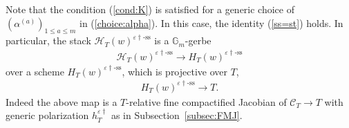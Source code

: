 \documentclass[11pt,oneside,a4paper,mathscr]{amsart}
\theoremstyle{definition}
\renewcommand{\leq}{\leqslant}
\newcommand{\cH}{\mathcal{H}}
\newcommand{\cC}{\mathcal{C}}
\newcommand{\vd}{\varepsilon\dag}
\begin{document}
Note that the condition (\ref{cond:K}) is satisfied for a generic choice of 
  $(\alpha^{(a)})_{1\leq a\leq m}$ in (\ref{choice:alpha}). 
In this case, the identity (\ref{ss=st}) holds. 
In particular, the stack $\cH_T(w)^{\varepsilon \dag \text{-ss}}$
is a $\mathbb{G}_m$-gerbe 
\begin{align}\label{Gmgerb}
    \cH_T(w)^{\varepsilon \dag \text{-ss}} \to H_T(w)^{\varepsilon \dag \text{-ss}}
\end{align}
over a scheme $H_T(w)^{\varepsilon \dag \text{-ss}}$, which is projective over $T$, 
\begin{align*}
    H_T(w)^{\varepsilon \dag \text{-ss}}\to T.
\end{align*}
Indeed the above map is a $T$-relative fine compactified Jacobian of 
$\cC_T\to T$ with generic polarization $h_T^{\vd}$ as in Subsection~\ref{subsec:FMJ}. 
\end{document}
